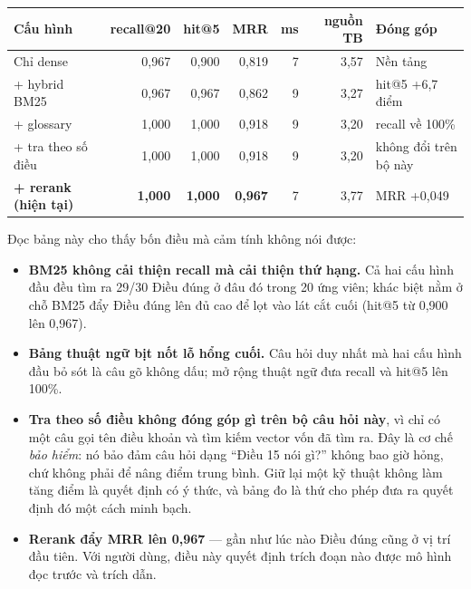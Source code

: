 \begin{rtable}
\begin{tabular}{@{}p{} r r r r r p{}@{}}
\toprule
\textbf{Cấu hình} & \textbf{recall@20} & \textbf{hit@5} & \textbf{MRR} & \textbf{ms}
  & \textbf{nguồn TB} & \textbf{Đóng góp} \\
\midrule
Chỉ dense          & 0,967 & 0,900 & 0,819 & 7 & 3,57 & Nền tảng \\
+ hybrid BM25      & 0,967 & 0,967 & 0,862 & 9 & 3,27 & hit@5 +6,7 điểm \\
+ glossary         & 1,000 & 1,000 & 0,918 & 9 & 3,20 & recall về 100\% \\
+ tra theo số điều & 1,000 & 1,000 & 0,918 & 9 & 3,20 & không đổi trên bộ này \\
\textbf{+ rerank (hiện tại)} & \textbf{1,000} & \textbf{1,000} & \textbf{0,967} & 7 & 3,77
  & MRR +0,049 \\
\bottomrule
\end{tabular}
\label{tab:eval}
\end{rtable}

Đọc bảng này cho thấy bốn điều mà cảm tính không nói được:

\begin{itemize}
  \item \textbf{BM25 không cải thiện recall mà cải thiện thứ hạng.} Cả hai cấu hình đầu đều tìm
  ra 29/30 Điều đúng ở đâu đó trong 20 ứng viên; khác biệt nằm ở chỗ BM25 đẩy Điều đúng lên đủ
  cao để lọt vào lát cắt cuối (hit@5 từ 0,900 lên 0,967).
  \item \textbf{Bảng thuật ngữ bịt nốt lỗ hổng cuối.} Câu hỏi duy nhất mà hai cấu hình đầu bỏ
  sót là câu gõ không dấu; mở rộng thuật ngữ đưa recall và hit@5 lên 100\%.
  \item \textbf{Tra theo số điều không đóng góp gì trên bộ câu hỏi này}, vì chỉ có một câu gọi
  tên điều khoản và tìm kiếm vector vốn đã tìm ra. Đây là cơ chế \emph{bảo hiểm}: nó bảo đảm
  câu hỏi dạng “Điều 15 nói gì?” không bao giờ hỏng, chứ không phải để nâng điểm trung bình.
  Giữ lại một kỹ thuật không làm tăng điểm là quyết định có ý thức, và bảng đo là thứ cho phép
  đưa ra quyết định đó một cách minh bạch.
  \item \textbf{Rerank đẩy MRR lên 0,967} — gần như lúc nào Điều đúng cũng ở vị trí đầu tiên.
  Với người dùng, điều này quyết định trích đoạn nào được mô hình đọc trước và trích dẫn.
\end{itemize}

